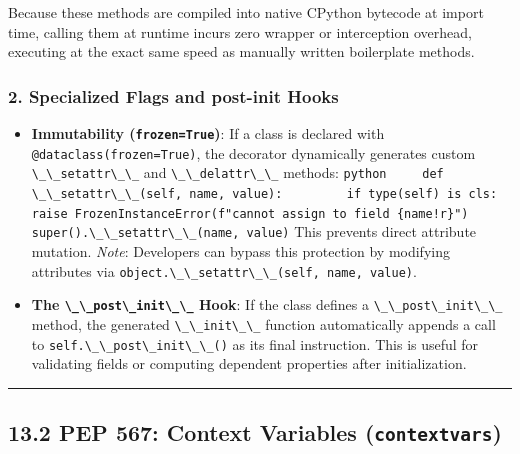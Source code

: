 Because these methods are compiled into native CPython bytecode at
import time, calling them at runtime incurs zero wrapper or interception
overhead, executing at the exact same speed as manually written
boilerplate methods.

\hypertarget{specialized-flags-and-post-init-hooks}{%
\subsubsection{2. Specialized Flags and post-init
Hooks}\label{specialized-flags-and-post-init-hooks}}

\begin{itemize}
\tightlist
\item
  \textbf{Immutability (\passthrough{\lstinline!frozen=True!})}: If a
  class is declared with
  \passthrough{\lstinline!@dataclass(frozen=True)!}, the decorator
  dynamically generates custom \passthrough{\lstinline!\_\_setattr\_\_!}
  and \passthrough{\lstinline!\_\_delattr\_\_!} methods:
  \passthrough{\lstinline'python     def \_\_setattr\_\_(self, name, value):         if type(self) is cls:             raise FrozenInstanceError(f"cannot assign to field \{name!r\}")         super().\_\_setattr\_\_(name, value)'}
  This prevents direct attribute mutation. \emph{Note}: Developers can
  bypass this protection by modifying attributes via
  \passthrough{\lstinline!object.\_\_setattr\_\_(self, name, value)!}.
\item
  \textbf{The \passthrough{\lstinline!\_\_post\_init\_\_!} Hook}: If the
  class defines a \passthrough{\lstinline!\_\_post\_init\_\_!} method,
  the generated \passthrough{\lstinline!\_\_init\_\_!} function
  automatically appends a call to
  \passthrough{\lstinline!self.\_\_post\_init\_\_()!} as its final
  instruction. This is useful for validating fields or computing
  dependent properties after initialization.
\end{itemize}

\begin{center}\rule{0.5\linewidth}{0.5pt}\end{center}

\hypertarget{pep-567-context-variables-contextvars}{%
\subsection{\texorpdfstring{13.2 PEP 567: Context Variables
(\texttt{contextvars})}{13.2 PEP 567: Context Variables (contextvars)}}\label{pep-567-context-variables-contextvars}}

